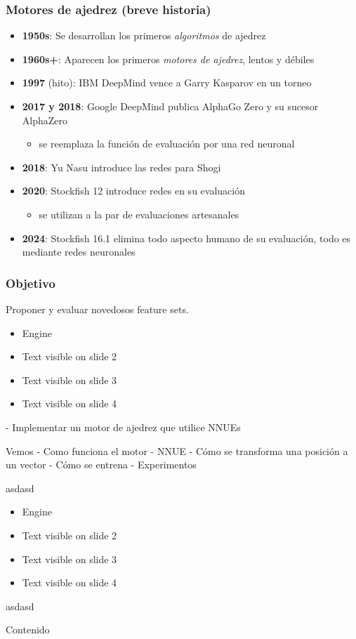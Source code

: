 \begin{frame}
\frametitle{Motores de ajedrez (breve historia)}
\begin{itemize}
    \item<1-> \textbf{1950s}: Se desarrollan los primeros \textit{algoritmos} de ajedrez
    \item<2-> \textbf{1960s+}: Aparecen los primeros \textit{motores de ajedrez}, lentos y débiles
    \item<3-> \textbf{1997} (hito): IBM DeepMind vence a Garry Kasparov en un torneo
    \item<4-> \textbf{2017 y 2018}: Google DeepMind publica AlphaGo Zero y su sucesor AlphaZero
    \begin{itemize}
        \item se reemplaza la función de evaluación por una red neuronal
    \end{itemize}
    \item<5-> \textbf{2018}: Yu Nasu introduce las redes  para Shogi
    \item<6-> \textbf{2020}: Stockfish 12 introduce redes  en su evaluación
    \begin{itemize}
        \item se utilizan a la par de evaluaciones artesanales
    \end{itemize}
    \item<7-> \textbf{2024}: Stockfish 16.1 elimina todo aspecto humano de su evaluación, todo es mediante redes neuronales
\end{itemize}
\end{frame}

\begin{frame}
\frametitle{Objetivo}

Proponer y evaluar novedosos feature sets. \\

\begin{itemize}
\item<1-> Engine
\item<2-> Text visible on slide 2
\item<3> Text visible on slide 3
\item<4-> Text visible on slide 4
\end{itemize}

- Implementar un motor de ajedrez que utilice NNUEs

Vemos
- Como funciona el motor
- NNUE
- Cómo se transforma una posición a un vector
- Cómo se entrena
- Experimentos

asdasd

\begin{itemize}
\item<1-> Engine
\item<2-> Text visible on slide 2
\item<3> Text visible on slide 3
\item<4-> Text visible on slide 4
\end{itemize}

asdasd

\end{frame}


\begin{frame}{Contenido}
\tableofcontents
\end{frame}
